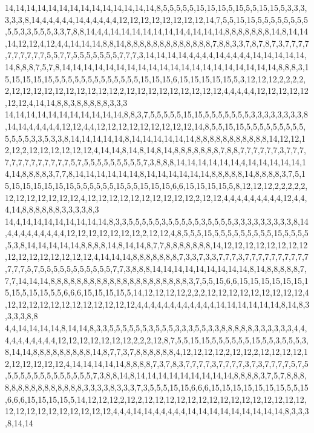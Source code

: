 14,14,14,14,14,14,14,14,14,14,14,14,14,14,8,5,5,5,5,5,15,15,15,5,15,5,5,15,15,5,3,3,3,3,3,3,8,14,4,4,4,4,4,14,4,4,4,4,4,12,12,12,12,12,12,12,12,14,7,5,5,15,15,5,5,5,5,5,5,5,5,5,5,3,3,5,5,5,3,3,7,8,8,14,4,4,14,14,14,14,14,14,14,4,14,14,14,8,8,8,8,8,8,8,14,8,14,14,14,12,12,4,12,4,4,14,14,14,8,8,14,8,8,8,8,8,8,8,8,8,8,8,8,8,7,8,8,3,3,7,8,7,8,7,3,7,7,7,7,7,7,7,7,7,7,5,5,7,7,5,5,5,5,5,5,5,7,7,7,3,14,14,14,14,4,4,4,4,14,4,4,4,4,14,14,14,14,14,14,8,8,8,7,5,7,8,14,14,14,14,14,14,14,14,14,14,14,14,14,14,14,14,14,14,14,14,8,8,8,3,15,15,15,15,15,5,5,5,5,5,5,5,5,5,5,5,5,5,15,15,15,6,15,15,15,15,15,5,3,12,12,12,2,2,2,2,2,12,12,12,12,12,12,12,12,12,12,2,12,12,12,12,12,12,12,12,12,4,4,4,4,4,12,12,12,12,12,12,12,4,14,14,8,8,3,8,8,8,8,8,3,3,3
14,14,14,14,14,14,14,14,14,14,14,8,8,3,7,5,5,5,5,5,15,15,5,5,5,5,5,5,5,3,3,3,3,3,3,3,3,8,14,14,4,4,4,4,4,12,12,4,4,12,12,12,12,12,12,12,12,12,14,8,5,5,15,15,5,5,5,5,5,5,5,5,5,5,5,5,5,3,3,5,3,3,8,14,14,14,14,14,8,14,14,14,14,14,14,8,8,8,8,8,8,8,8,8,8,8,14,12,12,12,12,2,12,12,12,12,12,12,4,14,14,8,14,8,14,8,14,8,8,8,8,8,8,8,7,8,8,7,7,7,7,7,7,3,7,7,7,7,7,7,7,7,7,7,7,7,7,5,7,5,5,5,5,5,5,5,5,5,7,3,8,8,8,14,14,14,14,14,14,4,14,14,14,14,14,14,14,8,8,8,8,3,7,7,8,14,14,14,14,14,14,8,14,14,14,14,14,14,8,8,8,8,8,14,8,8,8,8,3,7,5,15,15,15,15,15,15,15,5,5,5,5,5,5,15,5,5,15,15,15,6,6,15,15,15,15,5,8,12,12,12,2,2,2,2,2,12,12,12,12,12,12,12,4,12,12,12,12,12,12,12,12,12,12,2,12,12,4,4,4,4,4,4,4,4,4,12,4,4,4,14,8,8,8,8,8,8,3,3,3,3,8,3
14,4,14,14,14,14,14,14,14,14,8,3,3,5,5,5,5,5,3,5,5,5,5,5,3,5,5,5,5,3,3,3,3,3,3,3,3,3,8,14,4,4,4,4,4,4,4,4,4,12,12,12,12,12,12,12,2,12,12,4,8,5,5,5,15,5,5,5,5,5,5,5,5,5,15,5,5,5,5,5,3,8,14,14,14,14,14,8,8,8,8,14,8,14,14,8,7,7,8,8,8,8,8,8,8,14,12,12,12,12,12,12,12,12,12,12,12,12,12,12,12,12,4,14,14,14,8,8,8,8,8,8,8,7,3,3,7,3,3,7,7,7,3,7,7,7,7,7,7,7,7,7,7,7,7,7,5,7,5,5,5,5,5,5,5,5,5,5,5,7,7,3,8,8,8,14,14,14,14,14,14,14,14,14,8,14,8,8,8,8,8,7,7,7,14,14,14,8,8,8,8,8,8,8,8,8,8,8,8,8,8,8,8,8,8,8,8,8,3,7,5,5,15,6,6,15,15,15,15,15,15,15,15,5,15,15,5,5,6,6,6,15,15,15,15,5,14,12,12,12,12,2,2,2,12,12,12,12,12,12,12,12,12,4,12,12,12,12,12,12,12,12,12,12,12,12,4,4,4,4,4,4,4,4,4,4,4,4,14,14,14,14,14,14,8,14,8,3,3,3,3,8,8
4,4,14,14,14,14,8,14,14,8,3,3,5,5,5,5,5,5,3,5,5,5,3,3,3,5,5,3,3,8,8,8,8,8,3,3,3,3,3,3,4,4,4,4,4,4,4,4,4,4,12,12,12,12,12,12,12,2,2,2,12,8,7,5,5,15,15,5,5,5,5,5,5,15,5,5,3,5,5,5,3,8,14,14,8,8,8,8,8,8,8,8,8,14,8,7,7,3,7,8,8,8,8,8,8,4,12,12,12,12,2,12,12,2,12,12,12,12,12,12,12,12,12,12,4,14,14,14,14,14,8,8,8,8,7,3,7,8,3,7,7,7,7,3,7,7,7,7,3,7,3,7,7,7,7,5,7,5,5,5,5,5,5,5,5,5,5,5,5,5,5,7,3,8,8,14,8,14,14,14,14,14,14,14,14,14,8,8,8,8,3,7,5,7,8,8,8,8,8,8,8,8,8,8,8,8,8,8,8,3,3,3,3,8,3,3,3,7,3,5,5,5,15,15,6,6,6,15,15,15,15,15,15,15,5,5,15,6,6,6,15,15,15,15,5,14,12,12,12,2,12,2,12,12,12,12,12,12,12,12,12,12,12,12,12,12,12,12,12,12,12,12,12,12,12,12,12,4,4,4,14,14,4,4,4,4,4,14,14,14,14,14,14,14,14,14,8,3,3,3,8,14,14
